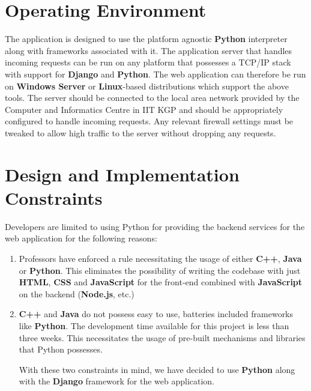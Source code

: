 \documentclass{scrreprt}
\begin{document}
\section{Operating Environment}
The application is designed to use the platform agnostic \textbf{Python} interpreter along with frameworks associated with it. The application server that handles incoming requests can be run on any platform that possesses a TCP/IP stack with support for \textbf{Django} and \textbf{Python}. The web application can therefore be run on \textbf{Windows Server} or \textbf{Linux}-based distributions which support the above tools.
The server should be connected to the local area network provided by the Computer and Informatics Centre in IIT KGP and should be appropriately configured to handle incoming requests. Any relevant firewall settings must be tweaked to allow high traffic to the server without dropping any requests.

\section{Design and Implementation Constraints}
Developers are limited to using Python for providing the backend services for the web application for the following reasons:
\begin{enumerate}
    \item Professors have enforced a rule necessitating the usage of either \textbf{C++}, \textbf{Java} or \textbf{Python}. This eliminates the possibility of writing the codebase with just \textbf{HTML}, \textbf{CSS} and \textbf{JavaScript} for the front-end combined with \textbf{JavaScript} on the backend (\textbf{Node.js}, etc.)
    \item \textbf{C++} and \textbf{Java} do not possess easy to use, batteries included frameworks like \textbf{Python}. The development time available for this project is less than three weeks. This necessitates the usage of pre-built mechanisms and libraries that Python possesses.

With these two constraints in mind, we have decided to use \textbf{Python} along with the \textbf{Django} framework for the web application.
\end{enumerate}
\end{document}
